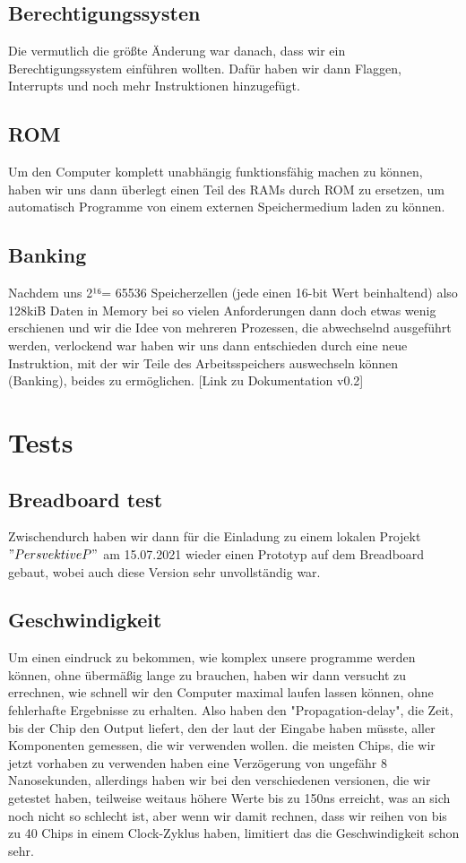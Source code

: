 \documentclass{scrartcl}
\begin{document}
    \subsection{Berechtigungssysten}
    Die vermutlich die größte Änderung war danach, dass wir ein Berechtigungssystem einführen wollten.
    Dafür haben wir dann Flaggen, Interrupts und noch mehr Instruktionen hinzugefügt.
    \subsection{ROM}
    Um den Computer komplett unabhängig funktionsfähig machen zu können, haben wir uns dann überlegt einen Teil des RAMs durch ROM zu ersetzen, um automatisch Programme von einem externen Speichermedium laden zu können.
    \subsection{Banking}
    Nachdem uns 2¹⁶= 65536 Speicherzellen (jede einen 16-bit Wert beinhaltend) also 128kiB Daten in Memory bei so vielen Anforderungen dann doch etwas wenig erschienen
    und wir die Idee von mehreren Prozessen, die abwechselnd ausgeführt werden, verlockend war haben wir uns dann entschieden durch eine neue Instruktion, mit der wir Teile des Arbeitsspeichers auswechseln können (Banking),
    beides zu ermöglichen. [Link zu Dokumentation v0.2]

    \section{Tests}
    \subsection{Breadboard test}
    Zwischendurch haben wir dann für die Einladung zu einem lokalen Projekt $"Persvektive P"$ am 15.07.2021 wieder einen Prototyp auf dem Breadboard gebaut, wobei auch diese Version sehr unvollständig war.

    \subsection{Geschwindigkeit}
    Um einen eindruck zu bekommen, wie komplex unsere programme werden können, ohne übermäßig lange zu brauchen, haben wir dann versucht zu errechnen, wie schnell wir den Computer maximal laufen lassen können, ohne fehlerhafte Ergebnisse zu erhalten.
    Also haben den "Propagation-delay", die Zeit, bis der Chip den Output liefert, den der laut der Eingabe haben müsste, aller Komponenten gemessen, die wir verwenden wollen.
    die meisten Chips, die wir jetzt vorhaben zu verwenden haben eine Verzögerung von ungefähr 8 Nanosekunden, allerdings haben wir bei den verschiedenen versionen, die wir getestet haben, teilweise weitaus höhere Werte bis zu 150ns erreicht, was an sich noch nicht so schlecht ist, aber wenn wir damit rechnen, dass wir reihen von bis zu 40 Chips in einem Clock-Zyklus haben, limitiert das die Geschwindigkeit schon sehr.
\end{document}
